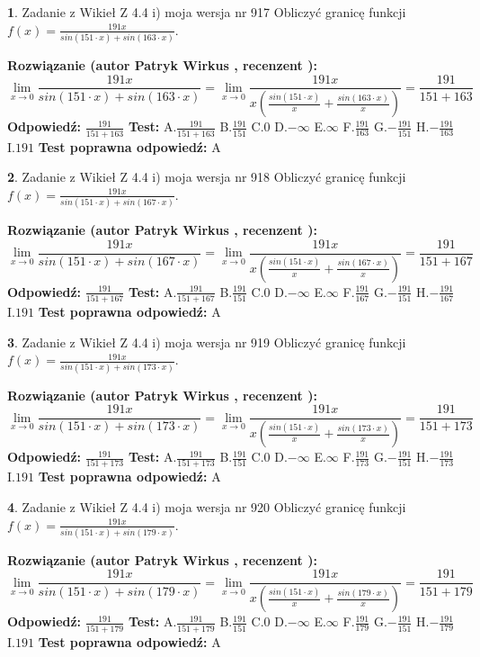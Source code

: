 \documentclass[12pt, a4paper]{article}
\theoremstyle{definition} %
\newtheorem{zad}{}
\newcommand{\zadStart}[1]{\begin{zad}#1\newline}
\newcommand{\zadStop}{\end{zad}}
\newcommand{\rozwStart}[2]{\noindent \textbf{Rozwiązanie (autor #1 , recenzent #2): }\newline}
\newcommand{\rozwStop}{\newline}
\newcommand{\odpStart}{\noindent \textbf{Odpowiedź:}\newline}
\newcommand{\odpStop}{\newline}
\newcommand{\testStart}{\noindent \textbf{Test:}\newline}
\newcommand{\testStop}{\newline}
\newcommand{\kluczStart}{\noindent \textbf{Test poprawna odpowiedź:}\newline}
\newcommand{\kluczStop}{\newline}
\begin{document}
\zadStart{Zadanie z Wikieł Z 4.4 i) moja wersja nr 917}
Obliczyć granicę funkcji $f(x)=\frac{191x}{sin(151\cdot x) +sin(163\cdot x)}$.
\zadStop
\rozwStart{Patryk Wirkus}{}
$$\lim\limits_{x\to 0}\frac{191x}{sin(151\cdot x) +sin(163\cdot x)}=\lim\limits_{x\to 0}\frac{191x}{x(\frac{sin(151\cdot x)}{x}+\frac{sin(163\cdot x)}{x})}=\frac{191}{151+163}$$
\rozwStop
\odpStart
$\frac{191}{151+163}$
\odpStop
\testStart
A.$\frac{191}{151+163}$
B.$\frac{191}{151}$
C.$0$
D.$-\infty$
E.$\infty$
F.$\frac{191}{163}$
G.$-\frac{191}{151}$
H.$-\frac{191}{163}$
I.$191$
\testStop
\kluczStart
A
\kluczStop



\zadStart{Zadanie z Wikieł Z 4.4 i) moja wersja nr 918}
Obliczyć granicę funkcji $f(x)=\frac{191x}{sin(151\cdot x) +sin(167\cdot x)}$.
\zadStop
\rozwStart{Patryk Wirkus}{}
$$\lim\limits_{x\to 0}\frac{191x}{sin(151\cdot x) +sin(167\cdot x)}=\lim\limits_{x\to 0}\frac{191x}{x(\frac{sin(151\cdot x)}{x}+\frac{sin(167\cdot x)}{x})}=\frac{191}{151+167}$$
\rozwStop
\odpStart
$\frac{191}{151+167}$
\odpStop
\testStart
A.$\frac{191}{151+167}$
B.$\frac{191}{151}$
C.$0$
D.$-\infty$
E.$\infty$
F.$\frac{191}{167}$
G.$-\frac{191}{151}$
H.$-\frac{191}{167}$
I.$191$
\testStop
\kluczStart
A
\kluczStop



\zadStart{Zadanie z Wikieł Z 4.4 i) moja wersja nr 919}
Obliczyć granicę funkcji $f(x)=\frac{191x}{sin(151\cdot x) +sin(173\cdot x)}$.
\zadStop
\rozwStart{Patryk Wirkus}{}
$$\lim\limits_{x\to 0}\frac{191x}{sin(151\cdot x) +sin(173\cdot x)}=\lim\limits_{x\to 0}\frac{191x}{x(\frac{sin(151\cdot x)}{x}+\frac{sin(173\cdot x)}{x})}=\frac{191}{151+173}$$
\rozwStop
\odpStart
$\frac{191}{151+173}$
\odpStop
\testStart
A.$\frac{191}{151+173}$
B.$\frac{191}{151}$
C.$0$
D.$-\infty$
E.$\infty$
F.$\frac{191}{173}$
G.$-\frac{191}{151}$
H.$-\frac{191}{173}$
I.$191$
\testStop
\kluczStart
A
\kluczStop



\zadStart{Zadanie z Wikieł Z 4.4 i) moja wersja nr 920}
Obliczyć granicę funkcji $f(x)=\frac{191x}{sin(151\cdot x) +sin(179\cdot x)}$.
\zadStop
\rozwStart{Patryk Wirkus}{}
$$\lim\limits_{x\to 0}\frac{191x}{sin(151\cdot x) +sin(179\cdot x)}=\lim\limits_{x\to 0}\frac{191x}{x(\frac{sin(151\cdot x)}{x}+\frac{sin(179\cdot x)}{x})}=\frac{191}{151+179}$$
\rozwStop
\odpStart
$\frac{191}{151+179}$
\odpStop
\testStart
A.$\frac{191}{151+179}$
B.$\frac{191}{151}$
C.$0$
D.$-\infty$
E.$\infty$
F.$\frac{191}{179}$
G.$-\frac{191}{151}$
H.$-\frac{191}{179}$
I.$191$
\testStop
\kluczStart
A
\kluczStop
\end{document}
